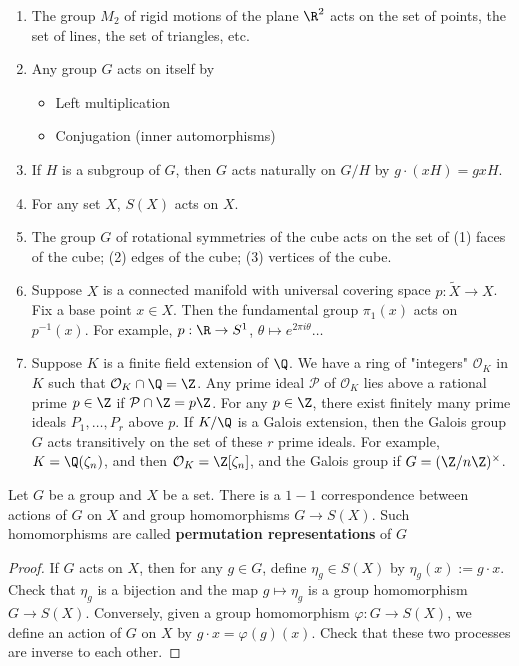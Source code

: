 \begin{ex}
    \begin{enumerate}
        \item The group $M_2$ of rigid motions of the plane $\R^2$ acts on the set of points, the set of lines, the set of triangles, etc.
        \item Any group $G$ acts on itself by
        \begin{itemize}
            \item Left multiplication
            \item Conjugation (inner automorphisms)
        \end{itemize}
        \item If $H$ is a subgroup of $G$, then $G$ acts naturally on $G/H$ by $g\cdot(xH)=gxH$.
        \item For any set $X$, $S(X)$ acts on $X$.
        \item The group $G$ of rotational symmetries of the cube acts on the set of (1) faces of the cube; (2) edges of the cube; (3) vertices of the cube.
        \item Suppose $X$ is a connected manifold with universal covering space $p:\tilde X \to X$. Fix a base point $x \in X$. Then the fundamental group $\pi_1(x)$ acts on $p^{-1}(x)$. For example, $p: \R \to S^1$, $\theta \mapsto e^{2\pi i \theta} \dots$
        \item Suppose $K$ is a finite field extension of $\Q$. We have a ring of "integers" $\mathcal O _K$ in $K$ such that $\mathcal O_K \cap \Q = \Z$. Any prime ideal $\mathcal P$ of $\mathcal O_K$ lies above a rational prime $p \in \Z$ if $\mathcal P \cap \Z = p\Z$. For any $p \in \Z$, there exist finitely many prime ideals $P_1,\dots,P_r$ above $p$. If $K/\Q$ is a Galois extension, then the Galois group $G$ acts transitively on the set of these $r$ prime ideals. For example, $K=\Q ( \zeta _n)$, and then $\mathcal O_K=\Z [\zeta _n]$, and the Galois group if $G = (\Z/n\Z)^\times$.
    \end{enumerate}
\end{ex}

\begin{prop}
    Let $G$ be a group and $X$ be a set. There is a $1-1$ correspondence between actions of $G$ on $X$ and group homomorphisms $G \to S(X)$. Such homomorphisms are called \textbf{permutation representations} of $G$
\end{prop}

\begin{proof}
    If $G$ acts on $X$, then for any $g \in G$, define $\eta_g \in S(X)$ by $\eta_g(x):=g\cdot x$. Check that $\eta_g$ is a bijection and the map $g \mapsto \eta_g$ is a group homomorphism $G \to S(X)$. Conversely, given a group homomorphism $\varphi :G \to S(X)$, we define an action of $G$ on $X$ by $g \cdot x = \varphi(g)(x)$. Check that these two processes are inverse to each other.
\end{proof}

